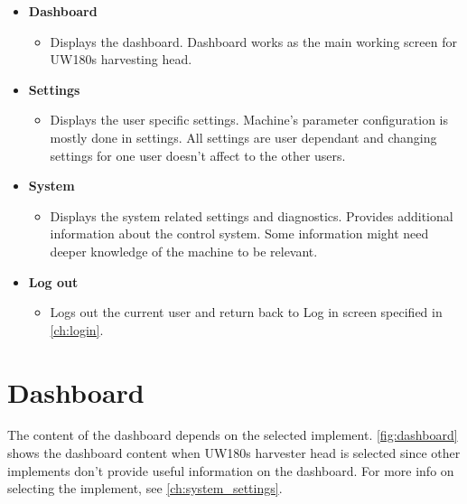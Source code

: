 \documentclass[12pt,a4paper,english]{uvmanual}
\begin{document}
\begin{itemize}
 \item \textbf{Dashboard}
 \begin{itemize}
  \item Displays the dashboard. Dashboard works as the main working screen for UW180s harvesting head.
 \end{itemize}

 \item \textbf{Settings}
 \begin{itemize}
  \item Displays the user specific settings. Machine's parameter configuration is mostly done in settings. All settings are user dependant and changing settings for one user doesn't affect to the other users.
 \end{itemize}
 
 \item \textbf{System}
 \begin{itemize}
  \item Displays the system related settings and diagnostics. Provides additional information about the control system. Some information might need deeper knowledge of the machine to be relevant.
 \end{itemize}

 \item \textbf{Log out}
 \begin{itemize}
  \item Logs out the current user and return back to Log in screen specified in \autoref{ch:login}.
 \end{itemize}

\end{itemize}


\chapter{Dashboard}\label{ch:dashboard}

The content of the dashboard depends on the selected implement. \autoref{fig:dashboard} shows the dashboard content when UW180s harvester head is selected since other implements don't provide useful information on the dashboard. For more info on selecting the implement, see \autoref{ch:system_settings}.

\end{document}
